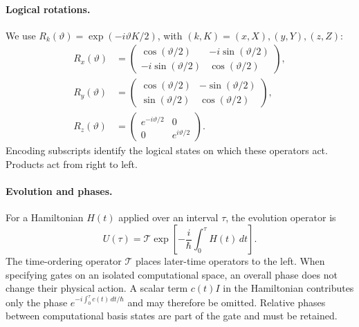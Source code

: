 \paragraph{Logical rotations.}
We use $R_k(\vartheta)=\exp(-i\vartheta K/2)$, with
$(k,K)=(x,X),(y,Y),(z,Z)$:
\begin{equation}
 \begin{aligned}
 R_x(\vartheta)&=
 \begin{pmatrix}
 \cos(\vartheta/2)&-i\sin(\vartheta/2)\\
 -i\sin(\vartheta/2)&\cos(\vartheta/2)
 \end{pmatrix},\\[3pt]
 R_y(\vartheta)&=
 \begin{pmatrix}
 \cos(\vartheta/2)&-\sin(\vartheta/2)\\
 \sin(\vartheta/2)&\cos(\vartheta/2)
 \end{pmatrix},\\[3pt]
 R_z(\vartheta)&=
 \begin{pmatrix}e^{-i\vartheta/2}&0\\0&e^{i\vartheta/2}\end{pmatrix}.
 \end{aligned}
 \label{eq:logical-rotation-matrices}
\end{equation}
Encoding subscripts identify the logical states on which these
operators act. Products act from right to left.

\paragraph{Evolution and phases.}
For a Hamiltonian $H(t)$ applied over an interval $\tau$, the
evolution operator is
\begin{equation}
 U(\tau)=\mathcal T\exp\!\left[-\frac{i}{\hbar}
                    \int_0^\tau H(t)\,dt\right].
 \label{eq:gate-time-evolution}
\end{equation}
The time-ordering operator $\mathcal T$ places later-time operators
to the left.
When specifying gates on an isolated computational space,
an overall phase does not change their physical action. A scalar
term $c(t)I$ in the Hamiltonian contributes only the phase
$e^{-i\int_0^\tau c(t)\,dt/\hbar}$ and may therefore be omitted.
Relative phases between computational basis states are part of
the gate and must be retained.

